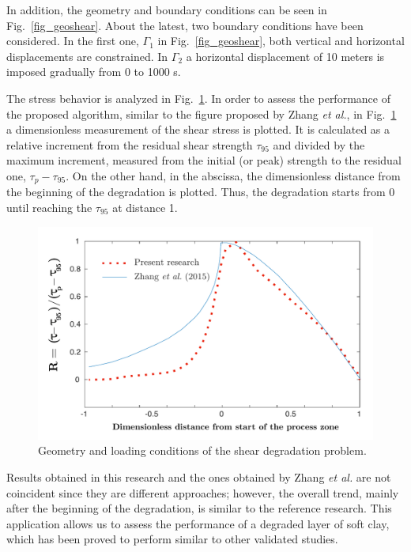 \documentclass[applsci,journal,article,submit,moreauthors,pdftex]{Definitions/mdpi}
\begin{document}
In addition, the geometry and boundary conditions can be seen in Fig.~\ref{fig_geoshear}. About the latest, two boundary conditions have been considered. In the first one, $\Gamma_1$ in Fig.~\ref{fig_geoshear}, both vertical and horizontal displacements are constrained. In $\Gamma_2$ a horizontal displacement of 10 meters is imposed gradually from 0 to 1000 s.

The stress behavior is analyzed in Fig.~\ref{fig_resshear}. In order to assess the performance of the proposed algorithm, similar to the figure proposed by Zhang \textit{et al.}\cite{Zhang2015}, in Fig.~\ref{fig_resshear} a dimensionless measurement of the shear stress is plotted. It is calculated as a relative increment from the residual shear strength $\tau_{95}$ and divided by the maximum increment, measured from the initial (or peak) strength to the residual one, $\tau_p-\tau_{95}$. On the other hand, in the abscissa, the dimensionless distance from the beginning of the degradation is plotted. Thus, the degradation starts from 0 until reaching the $\tau_{95}$ at distance 1. 

\begin{figure}[!t]
\begin{center}
\includegraphics[width=12cm]{Figs/shear.pdf}
\caption{Geometry and loading conditions of the shear degradation problem.}
\label{fig_resshear}
\end{center}
\end{figure}

Results obtained in this research and the ones obtained by Zhang \textit{et al.}\cite{Zhang2015} are not coincident since they are different approaches; however, the overall trend, mainly after the beginning of the degradation, is similar to the reference research. This application allows us to assess the performance of a degraded layer of soft clay, which has been proved to perform similar to other validated studies.
\end{document}

